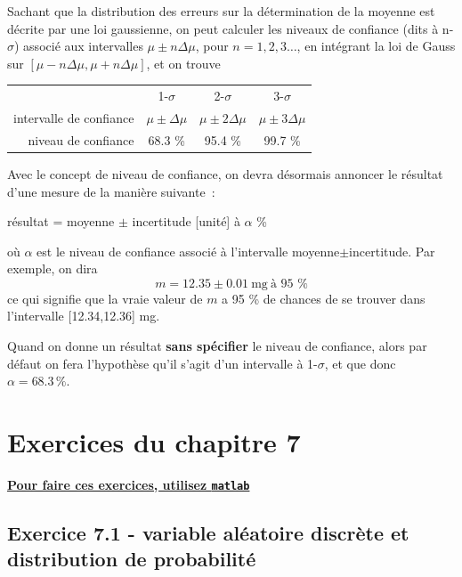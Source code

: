 Sachant que la distribution des erreurs sur la détermination de la moyenne est décrite par une loi gaussienne, on peut calculer les niveaux de confiance (dits à n-$\sigma$) associé aux intervalles $\mu\pm n\Delta\mu$, pour $n=1,2,3\dots$, en intégrant la loi de Gauss sur $[\mu-n\Delta\mu,\mu+n\Delta\mu]$, et on trouve
\begin{center}
\begin{tabular}{r|ccc}
 & 1-$\sigma$ & 2-$\sigma$ & 3-$\sigma$ \\
intervalle de confiance & $\mu\pm\Delta\mu$ & $\mu\pm2\Delta\mu$ & $\mu\pm3\Delta\mu$ \\
niveau de confiance & 68.3 \% & 95.4 \% & 99.7 \%
\end{tabular}
\end{center}

Avec le concept de niveau de confiance, on devra désormais annoncer le résultat d'une mesure de la manière suivante~:
\begin{center}
résultat = moyenne $\pm$ incertitude [unité] à $\alpha$ \%
\end{center}
où $\alpha$ est le niveau de confiance associé à l'intervalle moyenne$\pm$incertitude. Par exemple, on dira
$$
m=12.35\pm0.01\ \text{mg}\ \text{à 95 \%}
$$
ce qui signifie que la vraie valeur de $m$ a 95 \% de chances de se trouver dans l'intervalle [12.34,12.36] mg.

Quand on donne un résultat \textbf{sans spécifier} le niveau de confiance, alors par défaut on fera l'hypothèse qu'il s'agit d'un intervalle à 1-$\sigma$, et que donc $\alpha=68.3\,\%$.

\newpage

\section{Exercices du chapitre 7}

\begin{center}
\Large \bf {\underline{Pour faire ces exercices, utilisez \texttt{matlab}}}
\end{center}

\subsection*{Exercice 7.1 - variable aléatoire discrète et distribution de probabilité}

